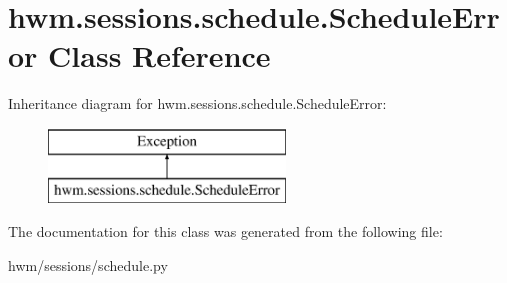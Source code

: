 \hypertarget{classhwm_1_1sessions_1_1schedule_1_1_schedule_error}{\section{hwm.\-sessions.\-schedule.\-Schedule\-Error Class Reference}
\label{classhwm_1_1sessions_1_1schedule_1_1_schedule_error}
}
Inheritance diagram for hwm.\-sessions.\-schedule.\-Schedule\-Error\-:\begin{figure}[H]
\begin{center}
\leavevmode
\includegraphics[height=2.000000cm]{classhwm_1_1sessions_1_1schedule_1_1_schedule_error}
\end{center}
\end{figure}


The documentation for this class was generated from the following file\-:\begin{DoxyCompactItemize}
\item 
hwm/sessions/schedule.\-py\end{DoxyCompactItemize}

